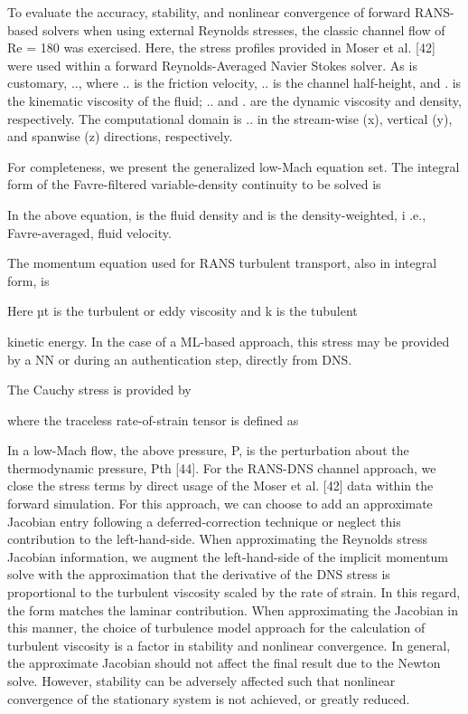 To evaluate the accuracy, stability, and nonlinear convergence of forward RANS-based solvers when using
external Reynolds stresses, the classic channel ﬂow of Re = 180 was exercised. Here, the stress proﬁles
provided in Moser et al. [42] were used within a forward Reynolds-Averaged Navier Stokes solver. As is
customary, .., where .. is the friction velocity, .. is the channel half-height, and . is the
kinematic viscosity of the ﬂuid; .. and . are the dynamic viscosity and density, respectively. The
computational domain is .. in the stream-wise (x), vertical (y), and spanwise (z)
directions, respectively.

For completeness, we present the generalized low-Mach equation set. The integral form of the
Favre-ﬁltered variable-density continuity to be solved is


In the above equation,  is the ﬂuid density and  is the density-weighted, i .e., Favre-averaged, ﬂuid
velocity.

The momentum equation used for RANS turbulent transport, also in integral form, is

Here µt is the turbulent or eddy viscosity and k is the tubulent

kinetic energy. In the case of a ML-based approach, this stress may be provided by a NN or during an
authentication step, directly from DNS.

The Cauchy stress is provided by

where the traceless rate-of-strain tensor is deﬁned as


In a low-Mach ﬂow, the above pressure, P, is the perturbation about the thermodynamic pressure,
Pth [44].
For the RANS-DNS channel approach, we close the stress terms by direct usage of the Moser et al. [42]
data within the forward simulation. For this approach, we can choose to add an approximate Jacobian entry
following a deferred-correction technique or neglect this contribution to the left-hand-side. When
approximating the Reynolds stress Jacobian information, we augment the left-hand-side of the implicit
momentum solve with the approximation that the derivative of the DNS stress is proportional to the
turbulent viscosity scaled by the rate of strain. In this regard, the form matches the laminar contribution.
When approximating the Jacobian in this manner, the choice of turbulence model approach for the
calculation of turbulent viscosity is a factor in stability and nonlinear convergence. In general, the
approximate Jacobian should not affect the ﬁnal result due to the Newton solve. However, stability can be
adversely affected such that nonlinear convergence of the stationary system is not achieved, or greatly
reduced.

